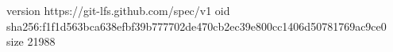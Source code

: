 version https://git-lfs.github.com/spec/v1
oid sha256:f1f1d563bca638efbf39b777702de470cb2ec39e800cc1406d50781769ac9ce0
size 21988
